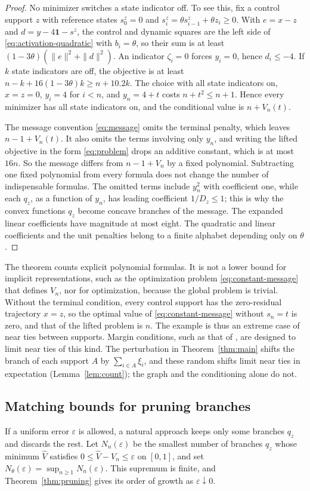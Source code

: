 \begin{proof}
No minimizer switches a state indicator off. To see this, fix a control
support $z$ with reference states $s_0^z=0$ and
$s_i^z=\theta s_{i-1}^z+\theta z_i\ge0$. With $e=x-z$ and
$d=y-4\mathbf1-s^z$, the control and dynamic squares are the left side
of \eqref{eq:activation-quadratic} with $b_i=\theta$, so their sum is
at least $(1-3\theta)(\|e\|^2+\|d\|^2)$. An indicator $\zeta_i=0$ forces
$y_i=0$, hence $d_i\le-4$. If $k$ state indicators are off, the
objective is at least $n-k+16(1-3\theta)k\ge n+10.2k$. The choice with
all state indicators on, $x=z=0$, $y_i=4$ for $i<n$, and $y_n=4+t$
costs $n+t^2\le n+1$. Hence every minimizer has all state indicators
on, and the conditional value is $n+V_n(t)$.

The message convention \eqref{eq:message} omits the terminal penalty,
which leaves $n-1+V_n(t)$. It also omits the terms involving only
$y_n$, and writing the lifted objective in the form \eqref{eq:problem}
drops an additive constant, which is at most $16n$. So the message
differs from $n-1+V_n$ by a fixed polynomial. Subtracting one fixed
polynomial from every formula does not change the number of
indispensable formulas. The omitted terms include $y_n^2$ with
coefficient one, while each $q_z$, as a function of $y_n$, has leading
coefficient $1/D_z\le1$; this is why the convex functions $q_z$ become
concave branches of the message. The expanded linear coefficients have
magnitude at most eight. The quadratic and linear coefficients and the
unit penalties belong to a finite alphabet depending only on $\theta$.
\end{proof}

The theorem counts explicit polynomial formulas. It is not a lower
bound for implicit representations, such as the optimization problem
\eqref{eq:constant-message} that defines $V_n$, nor for optimization,
because the global problem is trivial. Without the terminal condition,
every control support has the zero-residual trajectory $x=z$, so the
optimal value of \eqref{eq:constant-message} without $s_n=t$ is zero,
and that of the lifted problem is $n$. The example is thus an extreme
case of near ties between supports. Margin conditions, such as that of
\cite[Definition~5]{BhathenaStructured}, are designed to limit near ties
of this kind. The perturbation in Theorem~\ref{thm:main} shifts the
branch of each support $A$ by $\sum_{i\in A}\xi_i$, and these random
shifts limit near ties in expectation (Lemma~\ref{lem:count}); the
graph and the conditioning alone do not.

\subsection{Matching bounds for pruning branches}
\label{sec:limits-pruning}
If a uniform error $\varepsilon$ is allowed, a natural approach keeps
only some branches $q_z$ and discards the rest. Let $N_n(\varepsilon)$
be the smallest number of branches $q_z$ whose minimum $\widehat V$
satisfies $0\le\widehat V-V_n\le\varepsilon$ on $[0,1]$, and set
$N_\theta(\varepsilon)=\sup_{n\ge1}N_n(\varepsilon)$. This supremum is
finite, and Theorem~\ref{thm:pruning} gives its order of growth as
$\varepsilon\downarrow0$.

